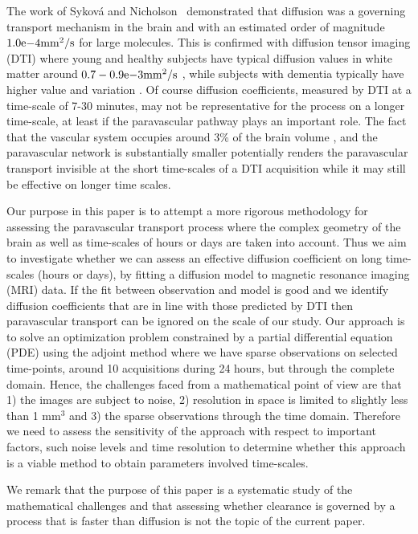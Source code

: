 \documentclass[11pt,a4paper]{article}
\begin{document}
The work of Sykov{\'a} and Nicholson~\cite{sykova2008diffusion} demonstrated
that diffusion was a governing transport mechanism in the brain and with an estimated order of magnitude $1.0\mathrm{e}{-4} \mathrm{mm\sp{2}/s}$ for large molecules. This is confirmed with diffusion tensor imaging (DTI) where young and healthy subjects have typical diffusion values in white matter around $0.7-0.9\mathrm{e}{-3} \mathrm{mm\sp{2}/s}$ \citet{Helenius194},
while subjects with dementia typically have higher value and variation \cite{goujon2018can} . Of course diffusion coefficients, 
measured by DTI at a time-scale of 7-30 minutes, may not be representative for the process on a
longer time-scale, at least if the paravascular pathway plays an important role. The fact that the vascular system occupies around 3\% of the brain volume  \cite{nicholson2001diffusion},
and the paravascular network is substantially smaller potentially renders the paravascular transport  invisible at the short time-scales of a DTI acquisition while it may still be effective on longer time scales. 


Our purpose in this paper is to attempt a more rigorous methodology 
for assessing the paravascular transport process where
the complex geometry of the brain as well as time-scales of hours or days are taken into account.
Thus we aim to investigate whether we can assess an effective diffusion coefficient on long time-scales (hours or days), by fitting a diffusion model to magnetic resonance imaging (MRI) data. If the fit between observation and model is good and we identify diffusion coefficients that are 
in line with those predicted by DTI then paravascular transport can be ignored on the scale of our study. 
Our approach is to solve an optimization problem constrained by a partial differential equation (PDE) using the adjoint method where we have sparse observations on selected time-points, around 10 acquisitions during 24 hours, but through
the complete domain. Hence, the challenges faced from a mathematical point of view 
are that 1) the images are subject to noise, 2) resolution in space is limited to slightly less than 1 $\mathrm{mm}^3$ and 3)
the sparse observations through the time domain. 
Therefore we need to assess the sensitivity of the approach with respect to important factors, such noise levels and time resolution to determine whether this approach is a viable method to obtain parameters involved time-scales. 

We remark that the purpose
of this paper is a systematic study of the mathematical challenges and that assessing  
whether clearance is governed by a process that is faster than diffusion is not the topic of the current paper. 
\end{document}
